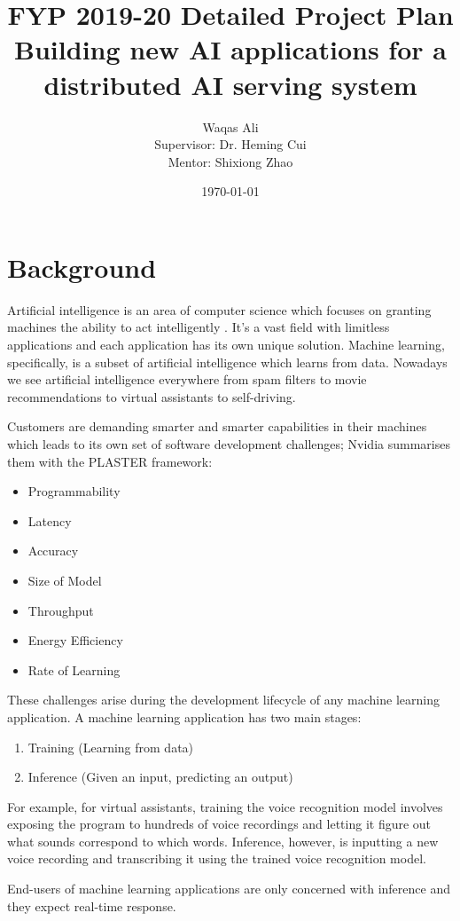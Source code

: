 \documentclass{article}
\title{FYP 2019-20 Detailed Project Plan \\ Building new AI applications for a distributed AI serving system}
\author{Waqas Ali\\{\small Supervisor: Dr. Heming Cui}\\{\small Mentor: Shixiong Zhao}}
\date{\today}
\begin{document}
\maketitle
 
\section{Background}
Artificial intelligence is an area of computer science which focuses on granting machines the ability to act intelligently \cite{McCarthy2007}. It's a vast field with limitless applications and each application has its own unique solution. Machine learning, specifically, is a subset of artificial intelligence which learns from data. \cite{Mitchell1997} Nowadays we see artificial intelligence everywhere from spam filters \cite{Androutsopoulos2000} to movie recommendations \cite{lekakos2008hybrid} to virtual assistants to self-driving.

Customers are demanding smarter and smarter capabilities in their machines which leads to its own set of software development challenges; Nvidia summarises them with the PLASTER \cite{Teich2018} framework:
\begin{itemize}
  \item Programmability
  \item Latency
  \item Accuracy
  \item Size of Model
  \item Throughput
  \item Energy Efficiency
  \item Rate of Learning
\end{itemize}

These challenges arise during the development lifecycle of any machine learning application. A machine learning application has two main stages:
\begin{enumerate}
  \item Training (Learning from data)
  \item Inference (Given an input, predicting an output)
\end{enumerate}

For example, for virtual assistants, training the voice recognition model involves exposing the program to hundreds of voice recordings and letting it figure out what sounds correspond to which words. Inference, however, is inputting a new voice recording and transcribing it using the trained voice recognition model.

End-users of machine learning applications are only concerned with inference and they expect real-time response.
\end{document}
